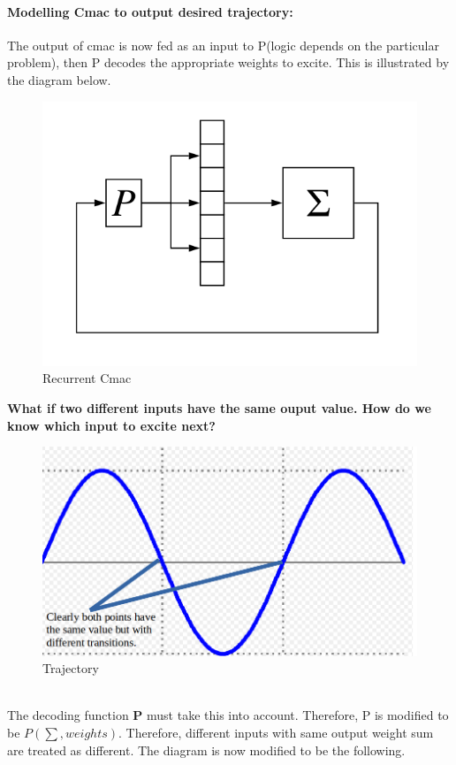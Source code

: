 \documentclass{article}
\begin{document}
\paragraph{Modelling Cmac to output desired trajectory:}
The output of cmac is now fed as an input to P(logic depends on the particular problem), then P decodes
the appropriate weights to excite. This is illustrated by the diagram below.

  \begin{figure}[h!]
    \centering
    \includegraphics[scale=0.35]{./Data/statemodelling.png}
    \caption{Recurrent Cmac}
  \end{figure}

  \textbf{What if two different inputs have the same ouput value. How do we know which input to excite next?}
  \begin{figure}[h!]
    \centering
    \includegraphics[scale=0.3]{./Data/model2.png}
    \caption{Trajectory}
  \end{figure} \\
  The decoding function \textbf{P} must take this into account. Therefore,  P is modified to be $P(\sum,weights)$. Therefore,
  different inputs with same output weight sum are treated as different. The diagram is now modified to be the following.
\end{document}
